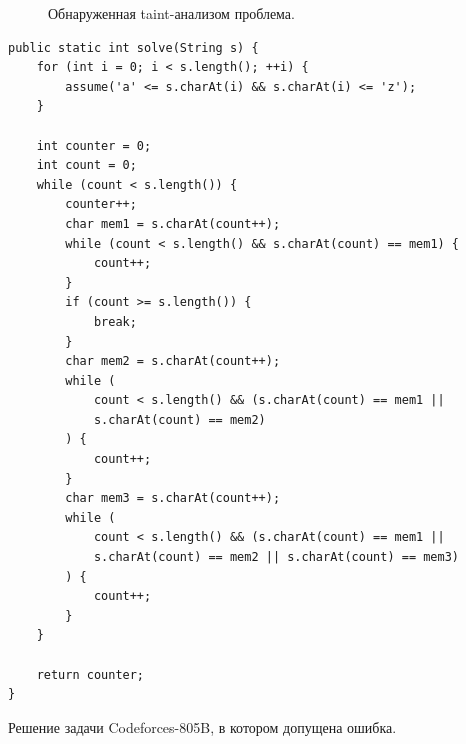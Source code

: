 \begin{figure}[ht]
\begin{flushleft}
\caption{
\label{problems-view-taint} Обнаруженная taint-анализом проблема.}
\end{flushleft}
\end{figure}


\begin{listing}[ht]
\begin{verbatim}
public static int solve(String s) {
    for (int i = 0; i < s.length(); ++i) {
        assume('a' <= s.charAt(i) && s.charAt(i) <= 'z');
    }

    int counter = 0;
    int count = 0;
    while (count < s.length()) {
        counter++;
        char mem1 = s.charAt(count++);
        while (count < s.length() && s.charAt(count) == mem1) {
            count++;
        }
        if (count >= s.length()) {
            break;
        }
        char mem2 = s.charAt(count++);
        while (
            count < s.length() && (s.charAt(count) == mem1 || 
            s.charAt(count) == mem2)
        ) {
            count++;
        }
        char mem3 = s.charAt(count++);
        while (
            count < s.length() && (s.charAt(count) == mem1 || 
            s.charAt(count) == mem2 || s.charAt(count) == mem3)
        ) {
            count++;
        }
    }

    return counter;
}
\end{verbatim}
\caption{Решение задачи Codeforces-805B, в котором допущена ошибка.}
\label{cf-example}
\end{listing}
